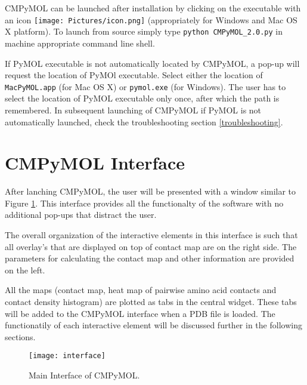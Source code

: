 \documentclass[11pt,fleqn]{book} %
\begin{document}
CMPyMOL can be launched after installation by clicking on the executable with an icon \texttt{[image: Pictures/icon.png]} (appropriately for Windows and Mac OS X platform). To launch from source simply type \texttt{python CMPyMOL\_2.0.py} in machine appropriate command line shell.

\begin{remark}
If PyMOL executable is not automatically located by CMPyMOL, a pop-up will request the location of PyMOl executable. Select either the location of \texttt{MacPyMOL.app} (for Mac OS X) or \texttt{pymol.exe} (for Windows). The user has to select the location of PyMOL executable only once, after which the path is remembered. In subsequent launching of CMPyMOL if PyMOL is not automatically launched, check the troubleshooting section \ref{troubleshooting}.
\end{remark}


\section{CMPyMOL Interface}

After lanching CMPyMOL, the user will be presented with a window similar to Figure \ref{interface}. This interface provides all the functionalty of the software with no additional pop-ups that distract the user. 

The overall organization of the interactive elements in this interface is such that all overlay's that are displayed on top of contact map are on the right side. The parameters for calculating the contact map and other information are provided on the left. 

All the maps (contact map, heat map of pairwise amino acid contacts and contact density histogram) are plotted as tabs in the central widget. These tabs will be added to the CMPyMOL interface when a PDB file is loaded. The functionatily of each interactive element will be discussed further in the following sections.

\begin{figure}[ht!]
\centering
  \begin{minipage}{\textwidth}
  \centering
      \texttt{[image: interface]}
      \caption{Main Interface of CMPyMOL.}
  \label{interface}
  \end{minipage}
\end{figure}
\end{document}
